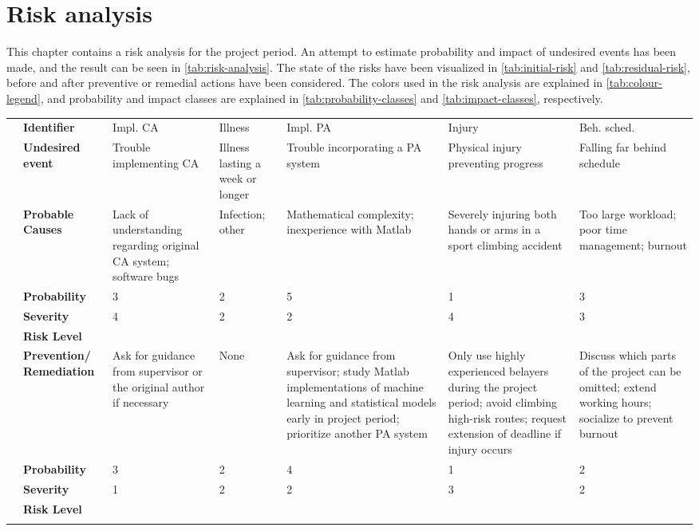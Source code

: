 \documentclass[informationsecurity]{gucmasterproject}
\begin{document}
\chapter{Risk analysis}
This chapter contains a risk analysis for the project period.
An attempt to estimate probability and impact of undesired events has been made, and the result can be seen in \autoref{tab:risk-analysis}.
The state of the risks have been visualized in \autoref{tab:initial-risk} and \autoref{tab:residual-risk}, before and after preventive or remedial actions have been considered.
The colors used in the risk analysis are explained in \autoref{tab:colour-legend}, and probability and impact classes are explained in \autoref{tab:probability-classes} and \autoref{tab:impact-classes}, respectively.

\begin{table}[H]
\scriptsize
\begin{tabular}{c| p{1.3cm}|p{1.5cm}|p{0.94cm}|p{2.5cm}|p{2.2cm}|p{1.7cm}|}
\hhline{~|------}
& \bf Identifier & Impl. CA & Illness & Impl. PA & Injury & Beh. sched.\\ \hhline{~|------|}
\bf & \bf Undesired event & Trouble implementing CA & Illness lasting a week or longer & Trouble incorporating a PA system & Physical injury preventing progress & Falling far behind schedule\\ \hhline{~|------|} 
& \bf Probable Causes & Lack of understanding regarding original CA system; software bugs & Infection; other & Mathematical complexity; inexperience with Matlab & Severely injuring both hands or arms in a sport climbing accident & Too large workload; poor time management; burnout\\ \hhline{~|------|}
\multirow{3}{*}{\rotatebox{90}{\tiny INITIAL\,}} & \bf Probability & 3 & 2 & 5 & 1 & 3  \\ \hhline{~|------|}
& \bf Severity & 4 & 2 & 2 & 4 & 3 \\ \hhline{~|------|}
& \bf Risk Level & \cellcolor{red!50} & \cellcolor{green!50} & \cellcolor{red!50} & \cellcolor{yellow!50} & \cellcolor{yellow!50}\\ \hhline{~|------|}
& \bf Prevention/ Remediation& Ask for guidance from supervisor or the original author if necessary & None & Ask for guidance from supervisor; study Matlab implementations of machine learning and statistical models early in project period; prioritize another PA system & Only use highly experienced belayers during the project period; avoid climbing high-risk routes; request extension of deadline if injury occurs & Discuss which parts of the project can be omitted; extend working hours; socialize to prevent burnout\\ \hhline{~|------|}
\multirow{3}{*}{\rotatebox{90}{\tiny RESIDUAL\,}}& \bf Probability & 3 & 2 & 4 & 1 & 2\\ \hhline{~|------|}
& \bf Severity & 1 & 2 & 2 & 3 & 2\\ \hhline{~|------|}
& \bf Risk Level & \cellcolor{green!50} & \cellcolor{green!50} & \cellcolor{yellow!50} & \cellcolor{green!50} & \cellcolor{green!50}\\
\hhline{~|------|}


\end{tabular}
\end{table}
\end{document}
